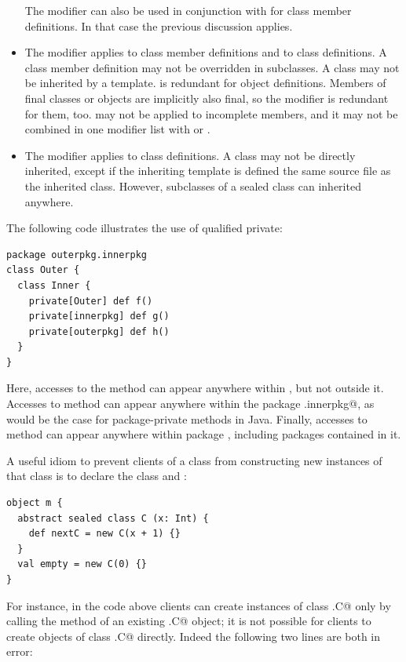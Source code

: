 \begin{itemize}
The  modifier can also be used in conjunction with
 for class member definitions. In that case the
previous discussion applies.
\item
The  modifier applies to class member definitions and to
class definitions. A  class member definition may not be
overridden in subclasses. A  class may not be inherited by
a template.  is redundant for object definitions.  Members
of final classes or objects are implicitly also final, so the
 modifier is redundant for them, too.   may
not be applied to incomplete members, and it may not be combined in one
modifier list with  or .
\item
The  modifier applies to class definitions. A
 class may not be directly inherited, except if the inheriting 
template is defined the same source file as the inherited class.
However, subclasses of a sealed class can inherited anywhere.
\end{itemize}

\example The following code illustrates the use of qualified private:
\begin{lstlisting}
package outerpkg.innerpkg
class Outer {
  class Inner {
    private[Outer] def f()
    private[innerpkg] def g()
    private[outerpkg] def h()
  }
}
\end{lstlisting}
Here, accesses to the method \lstinline@f@ can appear anywhere within
\lstinline@OuterClass@, but not outside it. Accesses to method
\lstinline@g@ can appear anywhere within the package
\lstinline@outerpkg.innerpkg@, as would be the case for
package-private methods in Java. Finally, accesses to method
\lstinline@h@ can appear anywhere within package \lstinline@outerpkg@,
including packages contained in it. 

\example A useful idiom to prevent clients of a class from
constructing new instances of that class is to declare the class
 and :

\begin{lstlisting}
object m {
  abstract sealed class C (x: Int) {
    def nextC = new C(x + 1) {}
  }
  val empty = new C(0) {}
}
\end{lstlisting}
For instance, in the code above clients can create instances of class
\lstinline@m.C@ only by calling the  method of an existing \lstinline@m.C@
object; it is not possible for clients to create objects of class
\lstinline@m.C@ directly. Indeed the following two lines are both in error:

